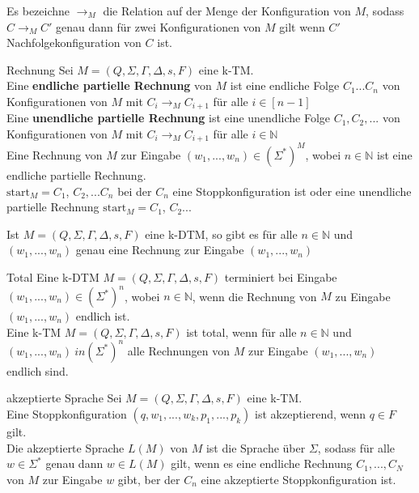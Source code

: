 
Es bezeichne $\rightarrow_M$ die Relation auf der Menge der Konfiguration von $M$, 
sodass $C \rightarrow_M C'$ genau dann für zwei Konfigurationen von $M$ gilt wenn $C'$ Nachfolgekonfiguration von $C$ ist. 

\begin{defn}{Rechnung}
    Sei $M = (Q, \Sigma, \Gamma, \Delta, s, F)$ eine k-TM. \\
    
    Eine \textbf{endliche partielle Rechnung} von $M$ ist eine endliche Folge
    $C_1...C_n$ von Konfigurationen von $M$ mit $C_i \rightarrow_M C_{i+1}$ für alle $i \in [n-1]$ \\

    Eine \textbf{unendliche partielle Rechnung} ist eine unendliche Folge $C_1,C_2,...$ von Konfigurationen von $M$
    mit $C_i \rightarrow_M C_{i+1}$ für alle $i \in \mathbb{N}$ \\

    Eine Rechnung von $M$ zur Eingabe $(w_1,...,w_n) \in (\Sigma^*)^M$, wobei $n \in \mathbb{N}$ ist eine endliche partielle Rechnung. \\
    $\text{start}_M = C_1$, $C_2,...C_n$ bei der $C_n$ eine Stoppkonfiguration ist oder eine unendliche partielle Rechnung $\text{start}_M = C_1$, $C_2...$ 
\end{defn}

\begin{bem}
    Ist $M = (Q, \Sigma, \Gamma, \Delta, s, F)$ eine k-DTM, so gibt es für alle $n \in \mathbb{N}$ und $(w_1,...,w_n)$
    genau eine Rechnung zur Eingabe $(w_1,...,w_n)$
\end{bem}

\begin{defn}{Total}
    Eine k-DTM $M = (Q, \Sigma, \Gamma, \Delta, s, F)$ terminiert bei Eingabe $(w_1,...,w_n) \in (\Sigma^*)^n$,
    wobei $n \in \mathbb{N}$, wenn die Rechnung von $M$ zu Eingabe $(w_1,...,w_n)$ endlich ist. \\

    Eine k-TM $M = (Q, \Sigma, \Gamma, \Delta, s, F)$ ist total,  wenn für alle $n \in \mathbb{N}$ und 
    $(w_1,...,w_n) \ in (\Sigma^*)^n$ alle Rechnungen von $M$ zur Eingabe $(w_1,...,w_n)$ endlich sind.
\end{defn}

\begin{defn}{akzeptierte Sprache}
    Sei $M = (Q, \Sigma, \Gamma, \Delta, s, F)$ eine k-TM. \\
    Eine Stoppkonfiguration $(q,w_1,...,w_k,p_1,...,p_k)$ ist akzeptierend, wenn $q \in F$ gilt. \\

    Die akzeptierte Sprache $L(M)$ von $M$ ist die Sprache über $\Sigma$, sodass für alle $w \in \Sigma^*$ genau dann $w \in L(M)$ gilt,
    wenn es eine endliche Rechnung $C_1,...,C_N$ von $M$ zur Eingabe $w$ gibt, ber der $C_n$ eine akzeptierte Stoppkonfiguration ist.
\end{defn}

